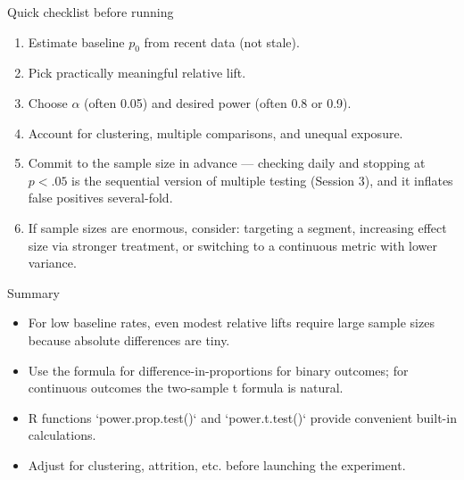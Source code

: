 \documentclass[aspectratio=169,11pt]{beamer}
\begin{document}
\begin{frame}{Quick checklist before running}
  \begin{enumerate}
    \item Estimate baseline $p_0$ from recent data (not stale).
    \item Pick practically meaningful \alert{relative} lift.
    \item Choose $\alpha$ (often 0.05) and desired power (often 0.8 or 0.9).
    \item Account for clustering, multiple comparisons, and unequal exposure.
    \item Commit to the sample size \alert{in advance} --- checking daily and stopping
    at $p<.05$ is the sequential version of multiple testing (Session 3), and it
    inflates false positives several-fold.
    \item If sample sizes are enormous, consider: targeting a segment, increasing effect size via stronger treatment, or switching to a continuous metric with lower variance.
  \end{enumerate}
\end{frame}

\begin{frame}{Summary}
  \begin{itemize}
    \item For low baseline rates, even modest relative lifts require large sample sizes because absolute differences are tiny.
    \item Use the formula for difference-in-proportions for binary outcomes; for continuous outcomes the two-sample t formula is natural.
    \item R functions `power.prop.test()` and `power.t.test()` provide convenient built-in calculations.
    \item Adjust for clustering, attrition, etc. before launching the experiment.
  \end{itemize}
\end{frame}


\end{document}
